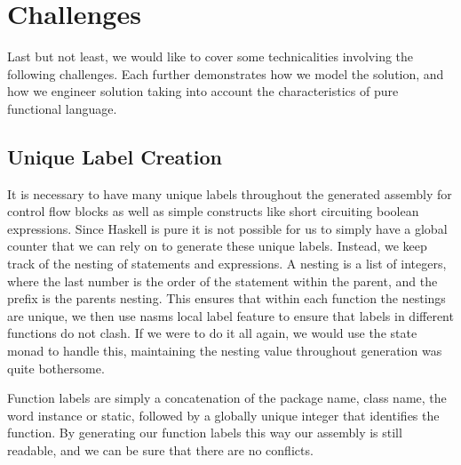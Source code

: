 \documentclass[12pt,letterpaper]{article}
\begin{document}
\section{Challenges}
Last but not least, we would like to cover some technicalities involving the following challenges. Each further demonstrates how we model the solution, and how we engineer solution taking into account the characteristics of pure functional language.

\subsection{Unique Label Creation}
It is necessary to have many unique labels throughout the generated assembly for control flow blocks as well as simple constructs like short circuiting boolean expressions.
Since Haskell is pure it is not possible for us to simply have a global counter that we can rely on to generate these unique labels.
Instead, we keep track of the nesting of statements and expressions.
A nesting is a list of integers, where the last number is the order of the statement within the parent, and the prefix is the parents nesting.
This ensures that within each function the nestings are unique, we then use nasms local label feature to ensure that labels in different functions do not clash.
If we were to do it all again, we would use the state monad to handle this, maintaining the nesting value throughout generation was quite bothersome.

Function labels are simply a concatenation of the package name, class name, the word instance or static, followed by a globally unique integer that identifies the function.
By generating our function labels this way our assembly is still readable, and we can be sure that there are no conflicts.

\end{document}
